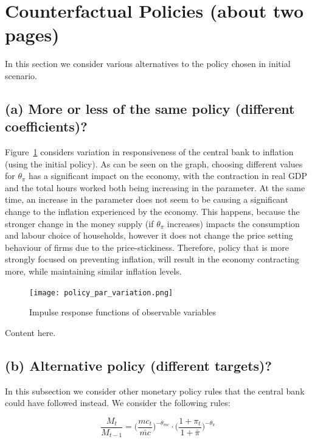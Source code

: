 \documentclass[12pt]{article}
\begin{document}
\newpage
\section{Counterfactual Policies (about two pages)}\label{s:counterfactual_policy}
In this section we consider various alternatives to the policy chosen in initial scenario.

\subsection*{(a) More or less of the same policy (different coefficients)?}

Figure~\ref{fig:policy_par_variation} considers variation in responsiveness of the central bank to inflation (using the initial policy). As can be seen on the graph, choosing different values for $\theta_{\pi}$ has a significant impact on the economy, with the contraction in real GDP and the total hours worked both being increasing in the parameter. At the same time, an increase in the parameter does not seem to be causing a significant change to the inflation experienced by the economy. This happens, because the stronger change in the money supply (if $\theta_\pi$ increases) impacts the consumption and labour choice of households, however it does not change the price setting behaviour of firms due to the price-stickiness. Therefore, policy that is more strongly focused on preventing inflation, will result in the economy contracting more, while maintaining similar inflation levels.

\begin{figure}[!h]
    \caption{Impulse response functions of observable variables}\label{fig:policy_par_variation}
    \centering
    \texttt{[image: policy\_par\_variation.png]}
\end{figure}
Content here.


\subsection*{(b) Alternative policy (different targets)?}

In this subsection we consider other monetary policy rules that the central bank could have followed instead. We consider the following rules:

\begin{equation}\label{eq:mc_rule}
    \frac{M_t}{M_{t-1}}
          = \Big(\frac{mc_t}{\bar{mc}}\Big)^{-\theta_{mc}}
            \cdot \Big(\frac{1 + \pi_t}{1 + \bar{\pi}}\Big)^{-\theta_{\pi}}
\end{equation}
\end{document}

